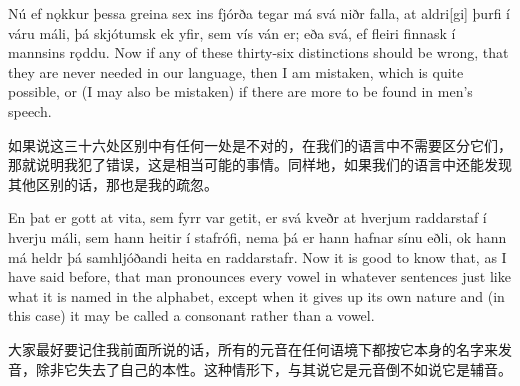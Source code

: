 \begin{paracol}{2}
    Nú ef nǫkkur þessa greina sex ins fjórða tegar má svá niðr falla, at aldri[gi] þurfi í váru máli, þá skjótumsk ek yfir, sem vís ván er; eða svá, ef fleiri finnask í mannsins rǫddu.
    \switchcolumn
    Now if any of these thirty-six distinctions should be wrong, that they are never needed in our language, then I am mistaken, which is quite possible, or (I may also be mistaken) if there are more to be found in men's speech.
\end{paracol}
\begin{translation*}{}
    如果说这三十六处区别中有任何一处是不对的，在我们的语言中不需要区分它们，那就说明我犯了错误，这是相当可能的事情。同样地，如果我们的语言中还能发现其他区别的话，那也是我的疏忽。
\end{translation*}

\begin{paracol}{2}
    En þat er gott at vita, sem fyrr var getit, er svá kveðr at hverjum raddarstaf í hverju máli, sem hann heitir í stafrófi, nema þá er hann hafnar sínu eðli, ok hann má heldr þá sam\-hljóðandi heita en raddarstafr.\footnotemark[1]
    \switchcolumn
    Now it is good to know that, as I have said before, that man pronounces every vowel in whatever sentences just like what it is named in the alphabet, except when it gives up its own nature and (in this case) it may be called a consonant rather than a vowel.
\end{paracol}
\begin{translation*}{}
    大家最好要记住我前面所说的话，所有的元音在任何语境下都按它本身的名字来发音，除非它失去了自己的本性。这种情形下，与其说它是元音倒不如说它是辅音。
\end{translation*}

